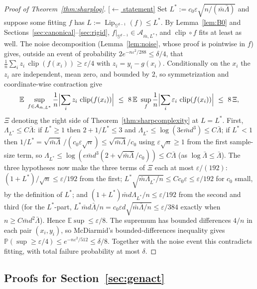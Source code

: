 \documentclass[11pt,reqno]{amsart}
\theoremstyle{plain}
\theoremstyle{definition}
\theoremstyle{remark}
\newcommand{\Sd}{\mathbb{S}^{d-1}}
\newcommand{\PP}{\mathbb{P}}
\newcommand{\EE}{\mathbb{E}}
\newcommand{\eps}{\varepsilon}
\newcommand{\Lip}{\operatorname{Lip}}
\newcommand{\AAA}{\mathcal{A}}
\DeclareMathOperator{\clip}{clip}
\newcommand{\stmtbutton}[1]{\hyperref[#1]{\textnormal{\footnotesize\textsf{[$\leftarrow$ statement]}}}}
\begin{document}
\begin{proof}[Proof of Theorem~\textup{\ref{thm:sharplog}}]\label{proof:sharplog}\stmtbutton{thm:sharplog}
Set $L^\ast:=c_0\eps\sqrt{n/(\bar m\bar\Lambda)}$ and suppose some fitting $f$ has $L:=\Lip_{\Sd}(f)\le L^\ast$. By Lemma~\ref{lem:B0} and Sections~\ref{sec:canonical}--\ref{sec:rigid}, $f|_{\Sd}\in\AAA_{\bar m,L^\ast}$, and $\clip\circ f$ fits at least as well. The noise decomposition (Lemma~\ref{lem:noise}, whose proof is pointwise in $f$) gives, outside an event of probability $2e^{-n\eps^2/288}\le\delta/4$, that $\tfrac1n\sum_iz_i\,\clip(f(x_i))\ge\eps/4$ with $z_i=y_i-g(x_i)$. Conditionally on the $x_i$ the $z_i$ are independent, mean zero, and bounded by $2$, so symmetrization and coordinate-wise contraction give
\[
\EE\ \sup_{f\in\AAA_{\bar m,L^\ast}}\frac1n\Bigl|\sum_iz_i\,\clip(f(x_i))\Bigr|\ \le\ 8\,\EE\ \sup_{f}\frac1n\Bigl|\sum_i\varepsilon_i\,\clip(f(x_i))\Bigr|\ \le\ 8\,\Xi,
\]
$\Xi$ denoting the right side of Theorem~\ref{thm:sharpcomplexity} at $L=L^\ast$. First, $\Lambda_{L^\ast}\le C\bar\Lambda$: if $L^\ast\ge1$ then $2+1/L^\ast\le3$ and $\Lambda_{L^\ast}\le\log(3e\bar md^3)\le C\bar\Lambda$; if $L^\ast<1$ then $1/L^\ast=\sqrt{\bar m\bar\Lambda}\,/(c_0\eps\sqrt n)\le\sqrt{\bar m\bar\Lambda}/c_0$ using $\eps\sqrt n\ge1$ from the first sample-size term, so $\Lambda_{L^\ast}\le\log(e\bar md^3(2+\sqrt{\bar m\bar\Lambda}/c_0))\le C\bar\Lambda$ (as $\log\bar\Lambda\le\bar\Lambda$). The three hypotheses now make the three terms of $\Xi$ each at most $\eps/(192)$: $(1+L^\ast)/\sqrt n\le\eps/192$ from the first; $L^\ast\sqrt{\bar m\Lambda_{L^\ast}/n}\le C c_0\eps\le\eps/192$ for $c_0$ small, by the definition of $L^\ast$; and $(1+L^\ast)\bar md\Lambda_{L^\ast}/n\le\eps/192$ from the second and third (for the $L^\ast$-part, $L^\ast\bar md\bar\Lambda/n=c_0\eps d\sqrt{\bar m\bar\Lambda/n}\le\eps/384$ exactly when $n\ge C\bar md^2\bar\Lambda$). Hence $\EE\sup\le\eps/8$. The supremum has bounded differences $4/n$ in each pair $(x_i,y_i)$, so McDiarmid's bounded-differences inequality \cite{McDiarmid} gives $\PP(\sup\ge\eps/4)\le e^{-n\eps^2/512}\le\delta/8$. Together with the noise event this contradicts fitting, with total failure probability at most $\delta$.
\end{proof}

\subsection{Proofs for Section~\ref{sec:genact}}
\end{document}
